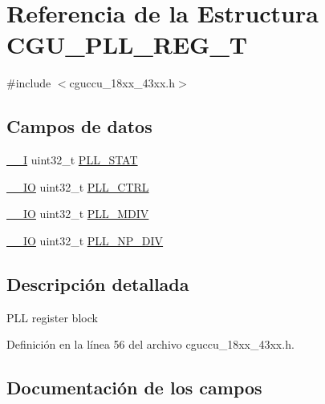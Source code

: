 \hypertarget{struct_c_g_u___p_l_l___r_e_g___t}{}\section{Referencia de la Estructura C\+G\+U\+\_\+\+P\+L\+L\+\_\+\+R\+E\+G\+\_\+T}
\label{struct_c_g_u___p_l_l___r_e_g___t}


{\ttfamily \#include $<$cguccu\+\_\+18xx\+\_\+43xx.\+h$>$}

\subsection*{Campos de datos}
\begin{DoxyCompactItemize}
\item 
\hyperlink{core__sc300_8h_af63697ed9952cc71e1225efe205f6cd3}{\+\_\+\+\_\+I} uint32\+\_\+t \hyperlink{struct_c_g_u___p_l_l___r_e_g___t_a8bc6e383ac2cac7fe5c0e4f9ac0a4fed}{P\+L\+L\+\_\+\+S\+T\+AT}
\item 
\hyperlink{core__sc300_8h_aec43007d9998a0a0e01faede4133d6be}{\+\_\+\+\_\+\+IO} uint32\+\_\+t \hyperlink{struct_c_g_u___p_l_l___r_e_g___t_ac44fd1b3cc9c8c43503c5f33bc249629}{P\+L\+L\+\_\+\+C\+T\+RL}
\item 
\hyperlink{core__sc300_8h_aec43007d9998a0a0e01faede4133d6be}{\+\_\+\+\_\+\+IO} uint32\+\_\+t \hyperlink{struct_c_g_u___p_l_l___r_e_g___t_a033ea2de72ec1feb7144e22c774d3a90}{P\+L\+L\+\_\+\+M\+D\+IV}
\item 
\hyperlink{core__sc300_8h_aec43007d9998a0a0e01faede4133d6be}{\+\_\+\+\_\+\+IO} uint32\+\_\+t \hyperlink{struct_c_g_u___p_l_l___r_e_g___t_ada13d18ce74e2c10d0e1e6ebb08091ed}{P\+L\+L\+\_\+\+N\+P\+\_\+\+D\+IV}
\end{DoxyCompactItemize}


\subsection{Descripción detallada}
P\+LL register block 

Definición en la línea 56 del archivo cguccu\+\_\+18xx\+\_\+43xx.\+h.



\subsection{Documentación de los campos}
